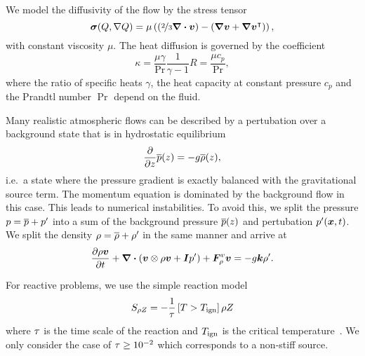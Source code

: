 \documentclass[runningheads]{llncs}
\begin{document}
We model the diffusivity of the flow by the stress tensor
\begin{equation}
  \label{eq:stress-tensor}
  \stressT(Q, \nabla Q) =
  \mu
  \left(
  \left(\nicefrac{2}{3} \divergence{\Qv} \right) -
  \left( \gradient{\Qv} + \gradient{\Qv}^\intercal \right)
  \right),
\end{equation}
with constant viscosity $\mu$.
The heat diffusion is governed by the coefficient
\begin{equation}
  \label{eq:heat-conduction-coeff}
  \kappa = \frac{\mu \gamma}{\Pr} \frac{1}{\gamma - 1} R = \frac{\mu c_p}{\Pr},
\end{equation}
where the ratio of specific heats $\gamma$, the heat capacity at constant pressure $c_p$ and the Prandtl number $\Pr$ depend on the fluid.

Many realistic atmospheric flows can be described by a pertubation over a background state that is in hydrostatic equilibrium
\newcommand{\backgroundPressure}{\overline{\pressure}}
\newcommand{\backgroundRho}{\overline{\Qrho}}
\begin{equation}
  \label{eq:hydrostatic-balance}
  \pdv{}{z} \backgroundPressure{\left (z \right )} = -g \backgroundRho(z),
\end{equation}
i.e.\ a state where the pressure gradient is exactly balanced with the gravitational source term.
The momentum equation is dominated by the background flow in this case.
This leads to numerical instabilities.
To avoid this, we split the pressure $\pressure = \backgroundPressure + \pressure'$ into a sum of the background pressure $\backgroundPressure(z)$ and pertubation $p'(\bm{x}, t)$.
We split the density $\Qrho = \backgroundRho + \Qrho'$ in the same manner and arrive at
\begin{equation}
  \label{eq:momentum-equation-split}
  \pdv{\Qj}{t}+ \divergence{ \left(
    \Qv \otimes \Qj + \bm{I} \pressure'
    \right)
  } + \viscFlux_\Qj
  =
  -g \bm{k} \Qrho'.
\end{equation}

For reactive problems, we use the simple reaction model
\begin{equation}
  \label{eq:reaction-model}
  \source[\QZ] = - \frac{1}{\reactionTimescale} \left[T > \reactionTemperature \right]\QZ
\end{equation}
where $\tau$ is the time scale of the reaction and $T_{\text{ign}}$ is the critical temperature~\cite{hidalgo2011ader,helzel2000modified}.
We only consider the case of $\tau \geq 10^{-2}$ which corresponds to a non-stiff source.
\end{document}
